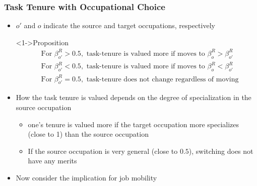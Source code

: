 \documentclass[11pt]{beamer}
\begin{document}
\begin{frame}
	\frametitle{Task Tenure with Occupational Choice}
	\begin{itemize}
		\item $o'$ and $o$ indicate the source and target occupations, respectively
	\begin{block}<1->{Proposition}
\begin{align*}
	&\text{For }\beta_{o'}^R>0.5,\text{ task-tenure is valued more if moves to }\beta_o^R > \beta_{o'}^R\\
	&\text{For }\beta_{o'}^R<0.5,\text{ task-tenure is valued more if moves to }\beta_o^R < \beta_{o'}^R\\
	&\text{For }\beta_{o'}^R = 0.5,\text{ task-tenure does not change regardless of moving}
\end{align*}
	\end{block}
		\item How the task tenure is valued depends on the degree of specialization in the source occupation
		\begin{itemize}
			\item one's tenure is valued more if the target occupation more specializes (close to 1) than the source occupation
			\item If the source occupation is very general (close to $0.5$), switching does not have any merits
		\end{itemize}
		\item Now consider the implication for job mobility
	\end{itemize}
\end{frame}
\end{document}
